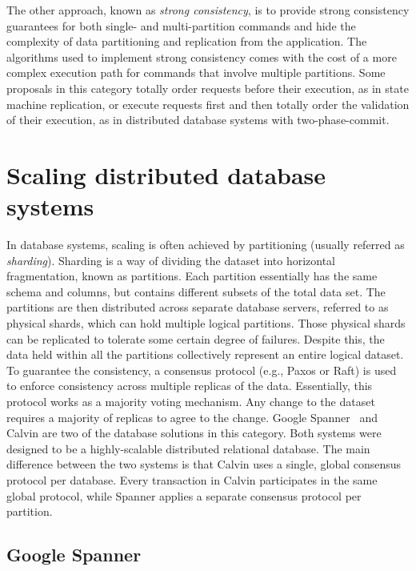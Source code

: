 The other approach, known as \emph{strong consistency}, is to provide strong
consistency guarantees for both single- and multi-partition commands and hide
the complexity of data partitioning and replication from the application. The
algorithms used to implement strong consistency comes with the cost of a more
complex execution path for commands that involve multiple partitions. Some
proposals in this category totally order requests before their execution, as in
state machine replication, or execute requests first and then totally order the
validation of their execution, as in distributed database systems with two-phase-commit.

\section{Scaling distributed database systems}

In database systems, scaling is often achieved by partitioning (usually referred
as \emph{sharding}). Sharding is a way of dividing the dataset into
horizontal fragmentation, known as partitions. Each partition essentially has
the same schema and columns, but contains different subsets of the total data
set. The partitions are then distributed across separate database servers,
referred to as physical shards, which can hold multiple logical partitions.
Those physical shards can be replicated to tolerate some certain degree of
failures. Despite this, the data held within all the partitions collectively
represent an entire logical dataset. To guarantee the consistency, a consensus
protocol (e.g., Paxos or Raft) is used  to enforce consistency across multiple
replicas of the data. Essentially, this protocol works as a majority voting
mechanism. Any change to the dataset requires a majority of replicas to agree to
the change. Google Spanner~\cite{corbett2013spanner} and Calvin \cite{calvin}
are two of the database solutions in this category. Both systems were designed
to be a highly-scalable distributed relational database. The main difference
between the two systems is that Calvin uses a single, global consensus protocol
per database. Every transaction in Calvin participates in the same global
protocol, while Spanner applies a separate consensus protocol per partition.



\subsection{Google Spanner}

